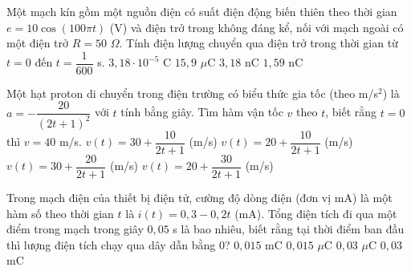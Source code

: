 \begin{ex}%
	Một mạch kín gồm một nguồn điện có suất điện động biến thiên theo thời gian $e=10\cos (100\pi t)$ (V) và điện trở trong không đáng kể, nối với mạch ngoài có một điện trở $R=50$ $\Omega$. Tính điện lượng chuyển qua điện trở trong thời gian từ $t=0$ đến $t=\dfrac{1}{600}$ s.
	\choice
	{\True $3{,}18\cdot 10^{-5}$ C}
	{$15{,}9$ $\mu$C}
	{$3{,}18$ nC}
	{$1{,}59$ nC}
\end{ex}
\begin{ex}%
	Một hạt proton di chuyển trong điện trường có biểu thức gia tốc (theo m/s$^2$) là $a=-\dfrac{20}{(2t+1)^2}$ với $t$ tính bằng giây. Tìm hàm vận tốc $v$ theo $t$, biết rằng $t=0$ thì $v=40$ m/s. 
	\choice
	{$v(t)=30+\dfrac{10}{2t+1}$ (m/s)}
	{\True $v(t)=20+\dfrac{10}{2t+1}$ (m/s)}
	{$v(t)=30+\dfrac{20}{2t+1}$ (m/s)}
	{$v(t)=20+\dfrac{30}{2t+1}$ (m/s)}
\end{ex}
\begin{ex}%
	Trong mạch điện của thiết bị điện tử, cường độ dòng điện (đơn vị mA) là một hàm số theo thời gian $t$ là $i(t)=0{,}3-0{,}2t$ (mA). Tổng điện tích đi qua một điểm trong mạch trong giây $0{,}05$ s là bao nhiêu, biết rằng tại thời điểm ban đầu thì lượng điện tích chạy qua dây dẫn bằng $0$?
	\choice
	{$0{,}015$ mC}
	{\True $0{,}015$ $\mu$C}
	{$0{,}03$ $\mu$C}
	{$0{,}03$ mC}
\end{ex}
